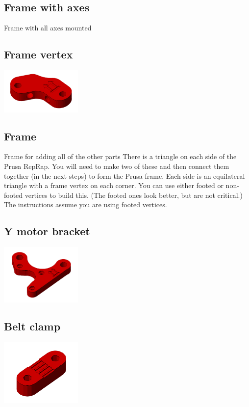 \documentclass[11pt]{article}
\begin{document}
\hypertarget{thing_frame-with-axes}{\subsection{Frame with axes}}
Frame with all axes mounted

\hypertarget{thing_frame-vertex}{\subsection{Frame vertex}}
\includegraphics[width=4cm]{images/frame-vertex.png}

\hypertarget{thing_frame}{\subsection{Frame}}
Frame for adding all of the other parts
There is a triangle on each side of the Prusa RepRap. You will need to make two of these and then connect them together (in the next steps) to form the Prusa frame. Each side is an equilateral triangle with a frame vertex on each corner. You can use either footed or non-footed vertices to build this. (The footed ones look better, but are not critical.) The instructions assume you are using footed vertices.

\hypertarget{thing_y-motor-bracket}{\subsection{Y motor bracket}}
\includegraphics[width=4cm]{images/y-motor-bracket.png}

\hypertarget{thing_belt-clamp}{\subsection{Belt clamp}}
\includegraphics[width=4cm]{images/belt-clamp.png}
\end{document}
